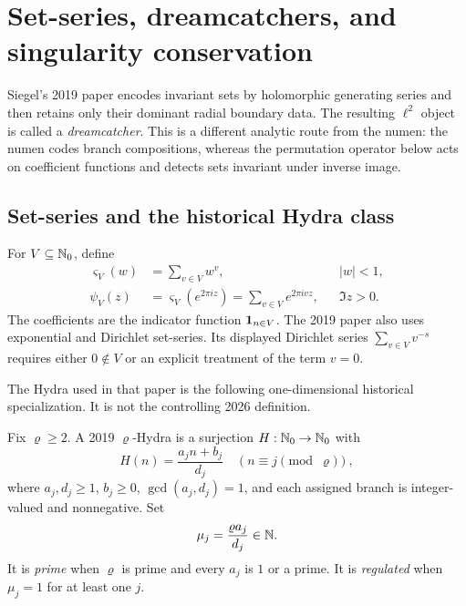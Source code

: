 \section{Set-series, dreamcatchers, and singularity conservation}
\label{sec:dreamcatchers}

Siegel's 2019 paper encodes invariant sets by holomorphic generating series
and then retains only their dominant radial boundary data.  The resulting
$\ell^2$ object is called a \emph{dreamcatcher}.  This is a different
analytic route from the numen: the numen codes branch compositions, whereas
the permutation operator below acts on coefficient functions and detects
sets invariant under inverse image.

\subsection{Set-series and the historical Hydra class}

For $V\subseteq\mathbb N_0$, define
\begin{align}
 \varsigma_V(w)&=\sum_{v\in V}w^v, && |w|<1,\label{eq:ordinary-set-series}\\
 \psi_V(z)&=\varsigma_V(e^{2\pi iz})
            =\sum_{v\in V}e^{2\pi ivz},&&\Im z>0.\label{eq:Fourier-set-series}
\end{align}
The coefficients are the indicator function $\mathbf 1_{n\in V}$.  The 2019 paper
also uses exponential and Dirichlet set-series.  Its displayed Dirichlet
series $\sum_{v\in V}v^{-s}$ requires either $0\notin V$ or an explicit
treatment of the term $v=0$.

The Hydra used in that paper is the following one-dimensional historical
specialization.  It is not the controlling 2026 definition.

\begin{definition}
Fix $\varrho\geq2$.  A 2019 $\varrho$-Hydra is a surjection
$H:\mathbb N_0\to\mathbb N_0$ with
\begin{equation}
\label{eq:2019-hydra}
 H(n)=\frac{a_jn+b_j}{d_j}
 \quad(n\equiv j\pmod\varrho),
\end{equation}
where $a_j,d_j\geq1$, $b_j\geq0$, $\gcd(a_j,d_j)=1$, and each assigned
branch is integer-valued and nonnegative.  Set
\begin{equation}
\label{eq:mu-j}
 \mu_j=\frac{\varrho a_j}{d_j}\in\mathbb N.
\end{equation}
It is \emph{prime} when $\varrho$ is prime and every $a_j$ is $1$ or a
prime.  It is \emph{regulated} when $\mu_j=1$ for at least one $j$.
\end{definition}

